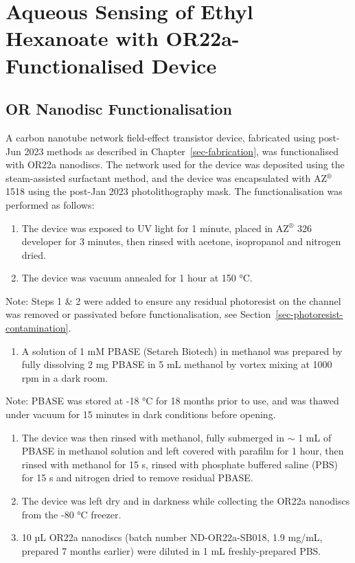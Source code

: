 \documentclass[
  a4paper,
]{scrbook}
\providecommand{\tightlist}{%
  \setlength{\itemsep}{0pt}\setlength{\parskip}{0pt}}\usepackage{longtable,booktabs,array}
\begin{document}
\hypertarget{sec-aqueous-sensing-EtHex}{%
\section{Aqueous Sensing of Ethyl Hexanoate with OR22a-Functionalised
Device}\label{sec-aqueous-sensing-EtHex}}

\hypertarget{sec-working-PBASE-functionalisation}{%
\subsection{OR Nanodisc
Functionalisation}\label{sec-working-PBASE-functionalisation}}

A carbon nanotube network field-effect transistor device, fabricated
using post-Jun 2023 methods as described in
Chapter~\ref{sec-fabrication}, was functionalised with OR22a nanodiscs.
The network used for the device was deposited using the steam-assisted
surfactant method, and the device was encapsulated with AZ\(^\circledR\)
1518 using the post-Jan 2023 photolithography mask. The
functionalisation was performed as follows:

\begin{enumerate}
\def\labelenumi{\arabic{enumi}.}
\item
  The device was exposed to UV light for 1 minute, placed in
  AZ\(^\circledR\) 326 developer for 3 minutes, then rinsed with
  acetone, isopropanol and nitrogen dried.
\item
  The device was vacuum annealed for 1 hour at 150 °C.
\end{enumerate}

Note: Steps 1 \& 2 were added to ensure any residual photoresist on the
channel was removed or passivated before functionalisation, see
Section~\ref{sec-photoresist-contamination}.

\begin{enumerate}
\def\labelenumi{\arabic{enumi}.}
\setcounter{enumi}{2}
\tightlist
\item
  A solution of 1 mM PBASE (Setareh Biotech) in methanol was prepared by
  fully dissolving 2 mg PBASE in 5 mL methanol by vortex mixing at 1000
  rpm in a dark room.
\end{enumerate}

Note: PBASE was stored at -18 °C for 18 months prior to use, and was
thawed under vacuum for 15 minutes in dark conditions before opening.

\begin{enumerate}
\def\labelenumi{\arabic{enumi}.}
\setcounter{enumi}{3}
\item
  The device was then rinsed with methanol, fully submerged in \(\sim\)
  1 mL of PBASE in methanol solution and left covered with parafilm for
  1 hour, then rinsed with methanol for 15 s, rinsed with phosphate
  buffered saline (PBS) for 15 s and nitrogen dried to remove residual
  PBASE.
\item
  The device was left dry and in darkness while collecting the OR22a
  nanodiscs from the -80 °C freezer.
\item
  10 µL OR22a nanodiscs (batch number ND-OR22a-SB018, 1.9 mg/mL,
  prepared 7 months earlier) were diluted in 1 mL freshly-prepared PBS.
\end{enumerate}
\end{document}
